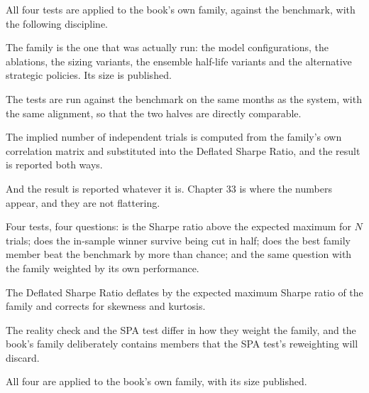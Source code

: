 All four tests are applied to the book's own family, against the
benchmark, with the following discipline.

The family is the one that was actually run: the model configurations,
the ablations, the sizing variants, the ensemble half-life variants and
the alternative strategic policies. Its size is published.

The tests are run against the benchmark on the same months as the system,
with the same alignment, so that the two halves are directly comparable.

The implied number of independent trials is computed from the family's own
correlation matrix and substituted into the Deflated Sharpe Ratio, and
the result is reported both ways.

And the result is reported whatever it is. Chapter 33 is where the
numbers appear, and they are not flattering.

\begin{keytakeaways}
\item Four tests, four questions: is the Sharpe ratio above the expected
maximum for \(N\) trials; does the in-sample winner survive being cut in
half; does the best family member beat the benchmark by more than chance;
and the same question with the family weighted by its own performance.
\item The Deflated Sharpe Ratio deflates by the expected maximum Sharpe
ratio of the family and corrects for skewness and kurtosis.
\item The reality check and the SPA test differ in how they weight the
family, and the book's family deliberately contains members that the SPA
test's reweighting will discard.
\item All four are applied to the book's own family, with its size
published.
\end{keytakeaways}

